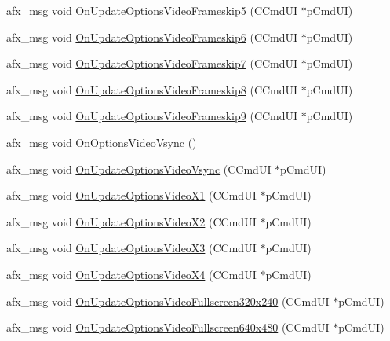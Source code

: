 \begin{DoxyCompactItemize}
\item 
afx\+\_\+msg void \mbox{\hyperlink{class_main_wnd_ae097e4242099e9486304041874aea0dc}{On\+Update\+Options\+Video\+Frameskip5}} (C\+Cmd\+UI $\ast$p\+Cmd\+UI)
\item 
afx\+\_\+msg void \mbox{\hyperlink{class_main_wnd_a741975d106105e7fb2dd0e9b6626b972}{On\+Update\+Options\+Video\+Frameskip6}} (C\+Cmd\+UI $\ast$p\+Cmd\+UI)
\item 
afx\+\_\+msg void \mbox{\hyperlink{class_main_wnd_a3d78f5ca60b11eae68cdc77c4a404331}{On\+Update\+Options\+Video\+Frameskip7}} (C\+Cmd\+UI $\ast$p\+Cmd\+UI)
\item 
afx\+\_\+msg void \mbox{\hyperlink{class_main_wnd_ab25f2cb1c1aca7a47fccb953ee77d6ae}{On\+Update\+Options\+Video\+Frameskip8}} (C\+Cmd\+UI $\ast$p\+Cmd\+UI)
\item 
afx\+\_\+msg void \mbox{\hyperlink{class_main_wnd_af7fce43b8808d14ab4de5b3e23c3db49}{On\+Update\+Options\+Video\+Frameskip9}} (C\+Cmd\+UI $\ast$p\+Cmd\+UI)
\item 
afx\+\_\+msg void \mbox{\hyperlink{class_main_wnd_ad539bc63bc7704f4aa66e3a75a39826b}{On\+Options\+Video\+Vsync}} ()
\item 
afx\+\_\+msg void \mbox{\hyperlink{class_main_wnd_a62d2c4008242d583674336b144f82bbd}{On\+Update\+Options\+Video\+Vsync}} (C\+Cmd\+UI $\ast$p\+Cmd\+UI)
\item 
afx\+\_\+msg void \mbox{\hyperlink{class_main_wnd_a74d2c1b8649f464fc5995638a22aabae}{On\+Update\+Options\+Video\+X1}} (C\+Cmd\+UI $\ast$p\+Cmd\+UI)
\item 
afx\+\_\+msg void \mbox{\hyperlink{class_main_wnd_a8577839827a8f6684675feb1820dae88}{On\+Update\+Options\+Video\+X2}} (C\+Cmd\+UI $\ast$p\+Cmd\+UI)
\item 
afx\+\_\+msg void \mbox{\hyperlink{class_main_wnd_aa6cb4b2f08200d2df0ead57a7d008ad9}{On\+Update\+Options\+Video\+X3}} (C\+Cmd\+UI $\ast$p\+Cmd\+UI)
\item 
afx\+\_\+msg void \mbox{\hyperlink{class_main_wnd_a3605271418d3f68bc60293ee699d6917}{On\+Update\+Options\+Video\+X4}} (C\+Cmd\+UI $\ast$p\+Cmd\+UI)
\item 
afx\+\_\+msg void \mbox{\hyperlink{class_main_wnd_afa6d29afbce490545bac5c87e99d18e6}{On\+Update\+Options\+Video\+Fullscreen320x240}} (C\+Cmd\+UI $\ast$p\+Cmd\+UI)
\item 
afx\+\_\+msg void \mbox{\hyperlink{class_main_wnd_a464b9ea581a489b94f09f6729041b62c}{On\+Update\+Options\+Video\+Fullscreen640x480}} (C\+Cmd\+UI $\ast$p\+Cmd\+UI)
\item 

\end{DoxyCompactItemize}
